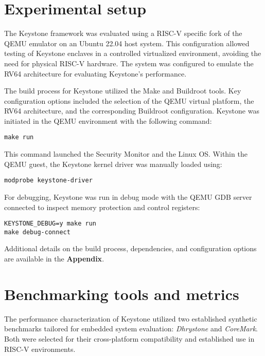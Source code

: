 \section{Experimental setup}

The Keystone framework was evaluated using a RISC-V specific fork of the QEMU emulator on an Ubuntu 22.04 host system. This configuration allowed testing of Keystone enclaves in a controlled virtualized environment, avoiding the need for physical RISC-V hardware. The system was configured to emulate the RV64 architecture for evaluating Keystone’s performance.

The build process for Keystone utilized the Make and Buildroot tools. Key configuration options included the selection of the QEMU virtual platform, the RV64 architecture, and the corresponding Buildroot configuration. Keystone was initiated in the QEMU environment with the following command:

\begin{verbatim}
make run
\end{verbatim}

This command launched the Security Monitor and the Linux OS. Within the QEMU guest, the Keystone kernel driver was manually loaded using:

\begin{verbatim}
modprobe keystone-driver
\end{verbatim}

For debugging, Keystone was run in debug mode with the QEMU GDB server connected to inspect memory protection and control registers:

\begin{verbatim}
KEYSTONE_DEBUG=y make run
make debug-connect
\end{verbatim}

Additional details on the build process, dependencies, and configuration options are available in the \textbf{Appendix}.

\section{Benchmarking tools and metrics}
The performance characterization of Keystone utilized two established synthetic benchmarks tailored for embedded system evaluation: \textit{Dhrystone} and \textit{CoreMark}. Both were selected for their cross-platform compatibility and established use in RISC-V environments.

